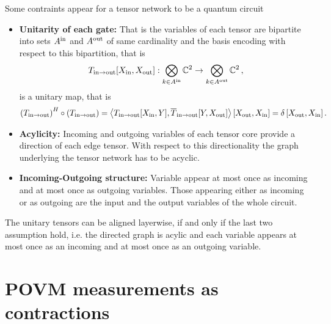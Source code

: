 \documentclass[aps,onecolumn,nofootinbib,pra]{article}
\begin{document}
    Some contraints appear for a tensor network to be a quantum circuit
    \begin{itemize}
        \item \textbf{Unitarity of each gate:} That is the variables of each tensor are bipartite into sets $A^{\mathrm{in}}$ and $A^{\mathrm{out}}$ of same cardinality and the basis encoding with respect to this bipartition, that is
            \begin{align*}
                T_{\mathrm{in} \rightarrow \mathrm{out}}[X_{\mathrm{in}},X_{\mathrm{out}}] : \bigotimes_{k\in A^{\mathrm{in}}} \mathbb{C}^2 \rightarrow \bigotimes_{k\in A^{\mathrm{out}}} \mathbb{C}^2  \, ,
            \end{align*}
            is a unitary map, that is
            \begin{align*}
                 \left(T_{\mathrm{in} \rightarrow \mathrm{out}}\right)^H \circ \left(T_{\mathrm{in} \rightarrow \mathrm{out}}\right)
                 = \left\langle 
                     T_{\mathrm{in} \rightarrow \mathrm{out}}[X_{\mathrm{in}},Y],
                     \overline{T}_{\mathrm{in} \rightarrow \mathrm{out}}[Y,X_{\mathrm{out}}]
                 \right\rangle \left[ X_{\mathrm{out}},X_{\mathrm{in}} \right]
                 = \delta\left[X_{\mathrm{out}},X_{\mathrm{in}}\right].
            \end{align*}
        \item \textbf{Acylicity:} Incoming and outgoing variables of each tensor core provide a direction of each edge tensor. With respect to this directionality the graph underlying the tensor network has to be acyclic.
        \item \textbf{Incoming-Outgoing structure:} Variable appear at most once as incoming and at most once as outgoing variables.
            Those appearing either as incoming or as outgoing are the input and the output variables of the whole circuit.
    \end{itemize}

    The unitary tensors can be aligned layerwise, if and only if the last two assumption hold, i.e. the directed graph is acylic and each variable appears at most once as an incoming and at most once as an outgoing variable.


    \section{POVM measurements as contractions}
\end{document}

